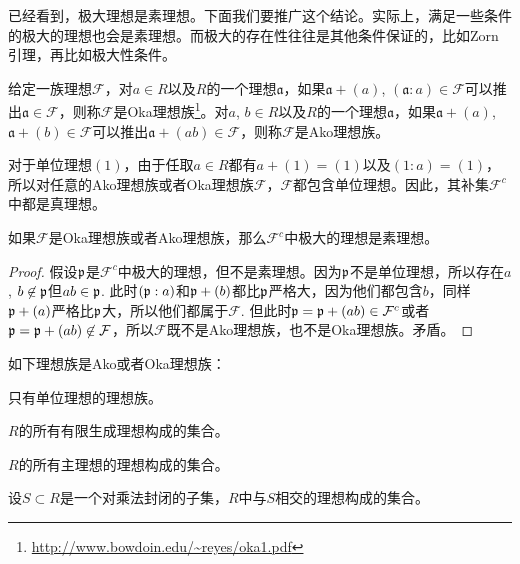 已经看到，极大理想是素理想。下面我们要推广这个结论。实际上，满足一些条件的极大的理想也会是素理想。而极大的存在性往往是其他条件保证的，比如Zorn引理，再比如极大性条件。

\begin{para}[Oka和Ako理想族] \label{oka}给定一族理想$\mathcal{F}$，对$a\in R$以及$R$的一个理想$\mathfrak{a}$，如果$\mathfrak{a}+(a)$, $(\mathfrak{a}:a)\in \mathcal{F}$可以推出$\mathfrak{a}\in \mathcal{F}$，则称$\mathcal{F}$是Oka理想族\footnote{\url{http://www.bowdoin.edu/~reyes/oka1.pdf}}。对$a$, $b\in R$以及$R$的一个理想$\mathfrak{a}$，如果$\mathfrak{a}+(a)$, $\mathfrak{a}+(b)\in \mathcal{F}$可以推出$\mathfrak{a}+(ab)\in \mathcal{F}$，则称$\mathcal{F}$是Ako理想族。
\end{para}

对于单位理想$(1)$，由于任取$a\in R$都有$a+(1)=(1)$以及$(1:a)=(1)$，所以对任意的Ako理想族或者Oka理想族$\mathcal{F}$，$\mathcal{F}$都包含单位理想。因此，其补集$\mathcal{F}^c$中都是真理想。

\begin{pro} 如果$\mathcal{F}$是Oka理想族或者Ako理想族，那么$\mathcal{F}^c$中极大的理想是素理想。
\end{pro}

\begin{proof}
	假设$\mathfrak{p}$是$\mathcal{F}^c$中极大的理想，但不是素理想。因为$\mathfrak{p}$不是单位理想，所以存在$a$, $b\not\in \mathfrak{p}$但$ab\in\mathfrak{p}$. 此时$(\mathfrak{p}:a)$和$\mathfrak{p}+(b)$都比$\mathfrak{p}$严格大，因为他们都包含$b$，同样$\mathfrak{p}+(a)$严格比$\mathfrak{p}$大，所以他们都属于$\mathcal{F}$. 但此时$\mathfrak{p}=\mathfrak{p}+(ab)\in \mathcal{F}^c$或者$\mathfrak{p}=\mathfrak{p}+(ab)\not\in \mathcal{F}$，所以$\mathcal{F}$既不是Ako理想族，也不是Oka理想族。矛盾。
\end{proof}

\begin{pro}
如下理想族是Ako或者Oka理想族：
\begin{compactenum}[~~~1.]
\item 只有单位理想的理想族。
\item $R$的所有有限生成理想构成的集合。
\item $R$的所有主理想的理想构成的集合。
\item 设$S\subset R$是一个对乘法封闭的子集，$R$中与$S$相交的理想构成的集合。
\end{compactenum}
\end{pro}


